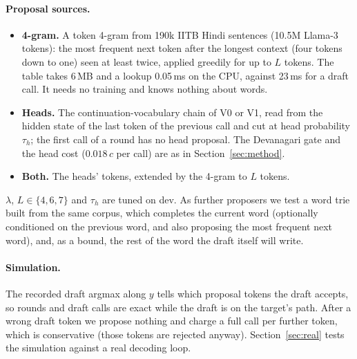 \paragraph{Proposal sources.}
\begin{itemize}
  \item \textbf{4-gram.} A token 4-gram from 190k IITB Hindi sentences (10.5M Llama-3 tokens): the
  most frequent next token after the longest context (four tokens down to one) seen at least twice,
  applied greedily for up to $L$ tokens. The table takes 6\,MB and a lookup 0.05\,ms on the CPU,
  against 23\,ms for a draft call. It needs no training and knows nothing about words.
  \item \textbf{Heads.} The continuation-vocabulary chain of V0 or V1, read from the hidden state of the
  last token of the previous call and cut at head probability $\tau_h$; the first call of a round has no
  head proposal. The Devanagari gate and the head cost ($0.018\,c$ per call) are as in
  Section~\ref{sec:method}.
  \item \textbf{Both.} The heads' tokens, extended by the 4-gram to $L$ tokens.
\end{itemize}
$\lambda$, $L\in\{4,6,7\}$ and $\tau_h$ are tuned on dev. As further proposers we test a word trie
built from the same corpus, which completes the current word (optionally conditioned on the previous
word, and also proposing the most frequent next word), and, as a bound, the rest of the word the draft
itself will write.

\paragraph{Simulation.} The recorded draft argmax along $y$ tells which proposal tokens the draft
accepts, so rounds and draft calls are exact while the draft is on the target's path. After a wrong
draft token we propose nothing and charge a full call per further token, which is conservative (those
tokens are rejected anyway). Section~\ref{sec:real} tests the simulation against a real decoding loop.


